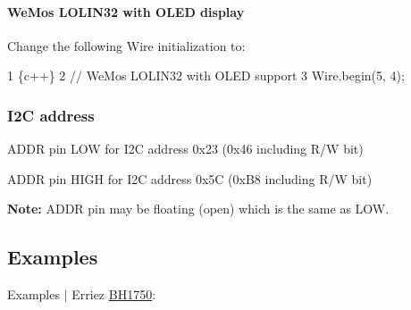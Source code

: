 \paragraph*{We\+Mos L\+O\+L\+I\+N32 with O\+L\+ED display}

Change the following Wire initialization to\+:


\begin{DoxyCode}
1 \{c++\}
2 // WeMos LOLIN32 with OLED support
3 Wire.begin(5, 4);
\end{DoxyCode}


\subsubsection*{I2C address}


\begin{DoxyItemize}
\item {\ttfamily A\+D\+DR} pin {\ttfamily L\+OW} for I2C address 0x23 (0x46 including R/W bit)
\item {\ttfamily A\+D\+DR} pin {\ttfamily H\+I\+GH} for I2C address 0x5C (0x\+B8 including R/W bit)
\end{DoxyItemize}

{\bfseries Note\+:} {\ttfamily A\+D\+DR} pin may be floating (open) which is the same as L\+OW.

\subsection*{Examples}

Examples $\vert$ Erriez \hyperlink{class_b_h1750}{B\+H1750}\+:


